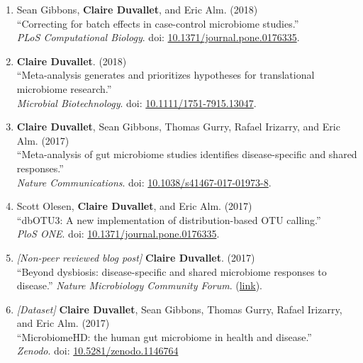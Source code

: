 \documentclass[10pt]{article}
\makeatletter
\newlength{\bibhang}
\newlength{\bibsep}
 {\@listi \global\bibsep\itemsep \global\advance\bibsep by\parsep}
\newenvironment{bibsection}%
        {\begin{enumerate}{}{%
       \setlength{\leftmargin}{\bibhang}%
       \setlength{\itemindent}{-\leftmargin}%
       \setlength{\itemsep}{\bibsep}%
       \setlength{\parsep}{\z@}%
        \setlength{\partopsep}{0pt}%
        \setlength{\topsep}{0pt}}}
        {\end{enumerate}\vspace{-.6\baselineskip}}
\makeatother
\begin{document}
\begin{bibsection}
	\item Sean Gibbons, \textbf{Claire Duvallet}, and Eric Alm. (2018) \\ 
		``Correcting for batch effects in case-control microbiome studies.'' \\ 
		\emph{PLoS Computational Biology}. doi: \href{https://doi.org/10.1371/journal.pcbi.1006102}{10.1371/journal.pone.0176335}.
		
	\item \textbf{Claire Duvallet}. (2018) \\ 
		``Meta-analysis generates and prioritizes hypotheses for translational microbiome research.'' \\ 
		\emph{Microbial Biotechnology}. doi: \href{https://doi.org/10.1111/1751-7915.13047}{10.1111/1751-7915.13047}.
		
	\item \textbf{Claire Duvallet}, Sean Gibbons, Thomas Gurry, Rafael  Irizarry, and Eric Alm. (2017) \\ 
		``Meta-analysis of gut microbiome studies identifies disease-specific and shared responses.'' \\ 
		\emph{Nature Communications}. doi: \href{https://doi.org/10.1038/s41467-017-01973-8}{10.1038/s41467-017-01973-8}.
		
	\item Scott Olesen, \textbf{Claire Duvallet}, and Eric Alm. (2017) \\ 
		``dbOTU3: A new implementation of distribution-based OTU calling.'' \\ 
		\emph{PloS ONE}. doi: \href{https://doi.org/10.1371/journal.pone.0176335}{10.1371/journal.pone.0176335}.
		
	\item \textit{[Non-peer reviewed blog post]} \textbf{Claire Duvallet}. (2017) \\ 
		``Beyond dysbiosis: disease-specific and shared microbiome responses to disease.'' 
		\emph{Nature Microbiology Community Forum}. (\href{https://naturemicrobiologycommunity.nature.com/users/70264-claire-duvallet/posts/22494-beyond-dysbiosis-disease-specific-and-shared-microbiome-responses-to-disease}{link}).
		
	\item \textit{[Dataset]} \textbf{Claire Duvallet}, Sean Gibbons, Thomas Gurry, Rafael Irizarry, and Eric Alm. (2017) \\ 
		``MicrobiomeHD: the human gut microbiome in health and disease.'' \\ 
		\emph{Zenodo}. doi: \href{https://zenodo.org/record/1146764}{10.5281/zenodo.1146764}
\end{bibsection}
\end{document}
